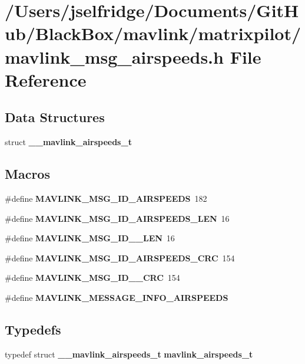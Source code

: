 \section{/\+Users/jselfridge/\+Documents/\+Git\+Hub/\+Black\+Box/mavlink/matrixpilot/mavlink\+\_\+msg\+\_\+airspeeds.h File Reference}
\label{mavlink__msg__airspeeds_8h}
\subsection*{Data Structures}
\begin{DoxyCompactItemize}
\item 
struct \textbf{ \+\_\+\+\_\+mavlink\+\_\+airspeeds\+\_\+t}
\end{DoxyCompactItemize}
\subsection*{Macros}
\begin{DoxyCompactItemize}
\item 
\#define \textbf{ M\+A\+V\+L\+I\+N\+K\+\_\+\+M\+S\+G\+\_\+\+I\+D\+\_\+\+A\+I\+R\+S\+P\+E\+E\+DS}~182
\item 
\#define \textbf{ M\+A\+V\+L\+I\+N\+K\+\_\+\+M\+S\+G\+\_\+\+I\+D\+\_\+\+A\+I\+R\+S\+P\+E\+E\+D\+S\+\_\+\+L\+EN}~16
\item 
\#define \textbf{ M\+A\+V\+L\+I\+N\+K\+\_\+\+M\+S\+G\+\_\+\+I\+D\+\_\+\_\+\+L\+EN}~16
\item 
\#define \textbf{ M\+A\+V\+L\+I\+N\+K\+\_\+\+M\+S\+G\+\_\+\+I\+D\+\_\+\+A\+I\+R\+S\+P\+E\+E\+D\+S\+\_\+\+C\+RC}~154
\item 
\#define \textbf{ M\+A\+V\+L\+I\+N\+K\+\_\+\+M\+S\+G\+\_\+\+I\+D\+\_\+\_\+\+C\+RC}~154
\item 
\#define \textbf{ M\+A\+V\+L\+I\+N\+K\+\_\+\+M\+E\+S\+S\+A\+G\+E\+\_\+\+I\+N\+F\+O\+\_\+\+A\+I\+R\+S\+P\+E\+E\+DS}
\end{DoxyCompactItemize}
\subsection*{Typedefs}
\begin{DoxyCompactItemize}
\item 
typedef struct \textbf{ \+\_\+\+\_\+mavlink\+\_\+airspeeds\+\_\+t} \textbf{ mavlink\+\_\+airspeeds\+\_\+t}
\end{DoxyCompactItemize}


